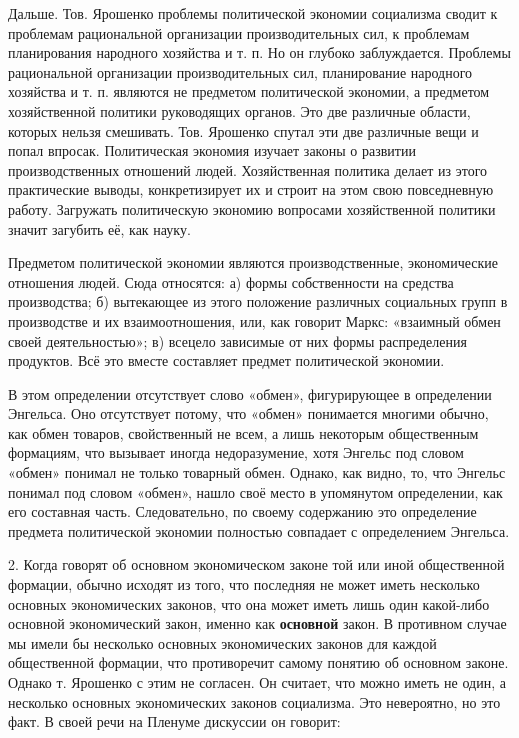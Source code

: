 \documentclass[12pt, a4paper, openany]{book}
\begin{document}
Дальше. Тов. Ярошенко проблемы политической экономии социализма сводит к проблемам рациональной организации производительных сил, к проблемам планирования народного хозяйства и т. п. Но он глубоко заблуждается. Проблемы рациональной организации производительных сил, планирование народного хозяйства и т. п. являются не предметом политической экономии, а предметом хозяйственной политики руководящих органов. Это две различные области, которых нельзя смешивать. Тов. Ярошенко спутал эти две различные вещи и попал впросак. Политическая экономия изучает законы о развитии производственных отношений людей. Хозяйственная политика делает из этого практические выводы, конкретизирует их и строит на этом свою повседневную работу. Загружать политическую экономию вопросами хозяйственной политики значит загубить её, как науку.



Предметом политической экономии являются производственные, экономические отношения людей. Сюда относятся: а) формы собственности на средства производства; б) вытекающее из этого положение различных социальных групп в производстве и их взаимоотношения, или, как говорит Маркс: «взаимный обмен своей деятельностью»; в) всецело зависимые от них формы распределения продуктов. Всё это вместе составляет предмет политической экономии.



В этом определении отсутствует слово «обмен», фигурирующее в определении Энгельса. Оно отсутствует потому, что «обмен» понимается многими обычно, как обмен товаров, свойственный не всем, а лишь некоторым общественным формациям, что вызывает иногда недоразумение, хотя Энгельс под словом «обмен» понимал не только товарный обмен. Однако, как видно, то, что Энгельс понимал под словом «обмен», нашло своё место в упомянутом определении, как его составная часть. Следовательно, по своему содержанию это определение предмета политической экономии полностью совпадает с определением Энгельса.



2. Когда говорят об основном экономическом законе той или иной общественной формации, обычно исходят из того, что последняя не может иметь несколько основных экономических законов, что она может иметь лишь один какой-либо основной экономический закон, именно как \textbf{основной} закон. В противном случае мы имели бы несколько основных экономических законов для каждой общественной формации, что противоречит самому понятию об основном законе. Однако т. Ярошенко с этим не согласен. Он считает, что можно иметь не один, а несколько основных экономических законов социализма. Это невероятно, но это факт. В своей речи на Пленуме дискуссии он говорит:
\end{document}
